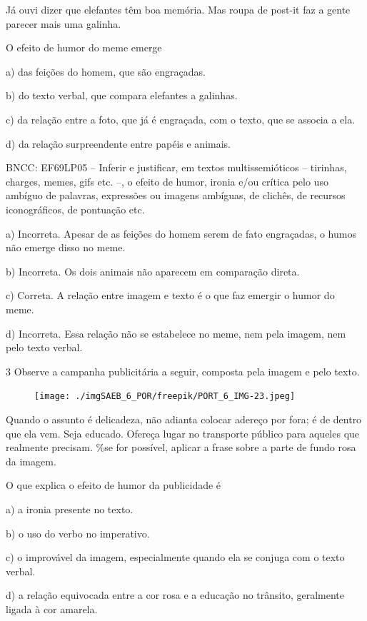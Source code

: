 Já ouvi dizer que elefantes têm boa memória. Mas roupa de post-it faz a
gente parecer mais uma galinha.

O efeito de humor do meme emerge

a) das feições do homem, que são engraçadas.

b) do texto verbal, que compara elefantes a galinhas.

c) da relação entre a foto, que já é engraçada, com o texto, que se
associa a ela.

d) da relação surpreendente entre papéis e animais.

BNCC: EF69LP05 -- Inferir e justificar, em textos multissemióticos --
tirinhas, charges, memes, gifs etc. --, o efeito de humor, ironia e/ou
crítica pelo uso ambíguo de palavras, expressões ou imagens ambíguas, de
clichês, de recursos iconográficos, de pontuação etc.

a) Incorreta. Apesar de as feições do homem serem de fato engraçadas, o
humos não emerge disso no meme.

b) Incorreta. Os dois animais não aparecem em comparação direta.

c) Correta. A relação entre imagem e texto é o que faz emergir o humor
do meme.

d) Incorreta. Essa relação não se estabelece no meme, nem pela imagem,
nem pelo texto verbal.

\num{3} Observe a campanha publicitária a seguir, composta pela imagem e
pelo texto.

\begin{figure}
\texttt{[image: ./imgSAEB\_6\_POR/freepik/PORT\_6\_IMG-23.jpeg]}
\end{figure}

Quando o assunto é delicadeza, não adianta colocar adereço por fora; é
de dentro que ela vem. Seja educado. Ofereça lugar no transporte público
para aqueles que realmente precisam. \%se for possível, aplicar a frase
sobre a parte de fundo rosa da imagem.

O que explica o efeito de humor da publicidade é

a) a ironia presente no texto.

b) o uso do verbo no imperativo.

c) o improvável da imagem, especialmente quando ela se conjuga com o
texto verbal.

d) a relação equivocada entre a cor rosa e a educação no trânsito,
geralmente ligada à cor amarela.

